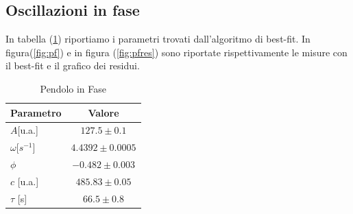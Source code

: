 \documentclass{article}
\begin{document}
             
             









            
		\subsection{  Oscillazioni in fase}

    
  In tabella (\ref{tab:pf}) riportiamo i parametri trovati dall'algoritmo di best-fit.
              In figura(\ref{fig:pf}) e in figura (\ref{fig:pfres}) sono riportate rispettivamente  le misure con il best-fit e il grafico dei residui. 
    
                \begin{table}[h! ]
                        \centering
                        \caption{Pendolo in Fase}
                        \begin{tabular}{|l|c|}
                        \hline
                        Parametro & Valore \\
                        \hline
                        $A$[u.a.] & $127.5 \pm 0.1$ \\
                        $\omega$[$s^{-1}$] & $4.4392 \pm 0.0005$ \\
                        $\phi$ & $-0.482 \pm 0.003$ \\
                        $c$ [u.a.]& $485.83 \pm 0.05$ \\
                        $\tau$ [s] & $66.5 \pm 0.8$ \\
                        \hline
                        \end{tabular}
                        \label{tab:pf}
                        
                \end{table}
\end{document}

